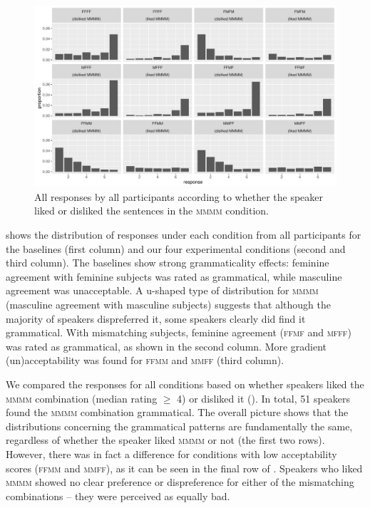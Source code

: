 \documentclass[output=paper,
modfonts,
newtxmath,
hidelinks
]{langscibook}
\begin{document}

\begin{figure}[b]
	\centering
	\includegraphics[height=.35\textheight]{figures/14all-resps.pdf}
	\caption{All responses by all participants according to whether the speaker liked or disliked the sentences in the \textsc{mmmm} condition.}\label{fig:all-resps-mmmm}
\end{figure}

 shows the distribution of responses under each condition from all participants for the baselines (first column) and our four experimental conditions (second and third column). The baselines show strong grammaticality effects: feminine agreement with feminine subjects was rated as grammatical, while masculine agreement was unacceptable. A u-shaped
type of distribution for \textsc{mmmm} (masculine agreement with masculine subjects) suggests that although the majority of
speakers dispreferred it, some speakers clearly did find it grammatical. With mismatching subjects, feminine agreement (\textsc{ffmf} and \textsc{mfff}) was rated as grammatical, as shown in the second column. More gradient (un)acceptability was found for  \textsc{ffmm} and \textsc{mmff} (third column).

We compared the responses for all conditions based on whether speakers liked the \textsc{mmmm} combination (median rating $\geq$ 4) or disliked it (). In total, 51 speakers found the \textsc{mmmm} combination grammatical. The overall picture shows that the distributions concerning the grammatical patterns are fundamentally the same, regardless of whether the speaker liked \textsc{mmmm} or not (the first two rows). However, there was in fact a difference for conditions with low acceptability scores (\textsc{ffmm} and \textsc{mmff}), as it can be seen in the final row of . Speakers who liked \textsc{mmmm} showed no clear preference or dispreference for either of the mismatching combinations -- they were perceived as equally bad.
\end{document}
